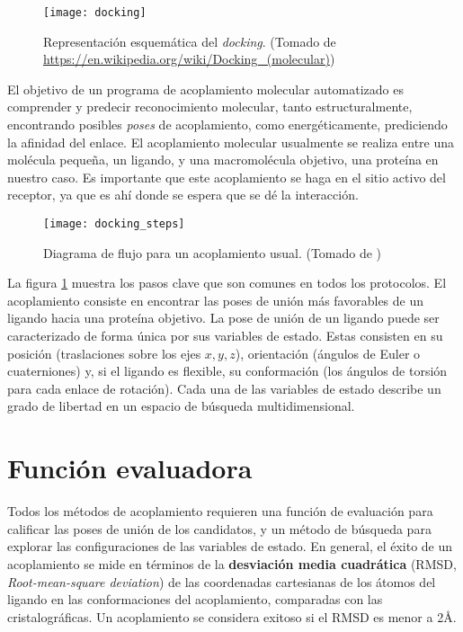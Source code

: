 \begin{figure}[H]
  \texttt{[image: docking]} \centering
  \caption{Representación esquemática del \textit{docking}.  (Tomado de
    \url{https://en.wikipedia.org/wiki/Docking_(molecular)})}
\end{figure}

El objetivo de un programa de acoplamiento molecular automatizado es
comprender y predecir reconocimiento molecular, tanto
estructuralmente, encontrando posibles \textit{poses} de acoplamiento,
como energéticamente, prediciendo la afinidad del enlace. El
acoplamiento molecular usualmente se realiza entre una molécula
pequeña, un ligando, y una macromolécula objetivo, una proteína en
nuestro caso. Es importante que este acoplamiento se haga en el sitio
activo del receptor, ya que es ahí donde se espera que se dé la
interacción.

\begin{center}
\begin{figure}[H]
  \texttt{[image: docking\_steps]}
  \caption{Diagrama de flujo para un acoplamiento usual.  (Tomado de
    \cite{kukol})}
  \label{fig:docking_flowchart}
\end{figure}
\end{center}

La figura \ref{fig:docking_flowchart} muestra los pasos clave que son
comunes en todos los protocolos. El acoplamiento consiste en encontrar
las poses de unión más favorables de un ligando hacia una proteína
objetivo. La pose de unión de un ligando puede ser caracterizado de
forma única por sus variables de estado. Estas consisten en su
posición (traslaciones sobre los ejes $x, y, z$), orientación (ángulos
de Euler o cuaterniones) y, si el ligando es flexible, su conformación
(los ángulos de torsión para cada enlace de rotación). Cada una de las
variables de estado describe un grado de libertad en un espacio de
búsqueda multidimensional.

\section{Función evaluadora}
Todos los métodos de acoplamiento requieren una función de evaluación
para calificar las poses de unión de los candidatos, y un método de
búsqueda para explorar las configuraciones de las variables de
estado. En general, el éxito de un acoplamiento se mide en términos de
la \textbf{desviación media cuadrática}
(RMSD, \textit{Root-mean-square deviation}) de las coordenadas
cartesianas de los átomos del ligando en las conformaciones del
acoplamiento, comparadas con las cristalográficas. Un acoplamiento se
considera exitoso si el RMSD es menor a 2\AA.

